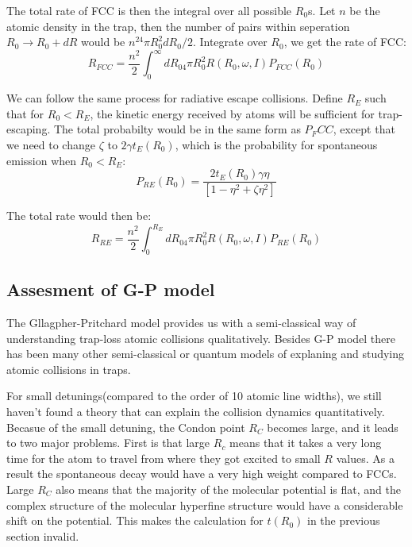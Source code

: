 \documentclass{article}
\begin{document}
The total rate of FCC is then the integral over all possible $R_0$s. Let $n$ be the atomic density in the trap, then the number of pairs within seperation $R_0\rightarrow R_0+dR$ would be $n^24\pi R_0^2dR_0/2$. Integrate over $R_0$, we get the rate of FCC:
$$R_{FCC}=\frac{n^2}{2}\int_0^\infty dR_04\pi R_0^2R(R_0,\omega,I)P_{FCC}(R_0)$$
 
We can follow the same process for radiative escape collisions. Define $R_E$ such that for $R_0<R_E$, the kinetic energy received by atoms will be sufficient for trap-escaping. The total probabilty would be in the same form as $P_FCC$, except that we need to change $\zeta$ to $2\gamma t_E(R_0)$, which is the probability for spontaneous emission when $R_0<R_E$:
$$P_{RE}(R_0)=\frac{2t_E(R_0)\gamma\eta}{[1-\eta^2+\zeta\eta^2]}$$

The total rate would then be:
$$R_{RE}=\frac{n^2}{2}\int_0^{R_E} dR_04\pi R_0^2R(R_0,\omega,I)P_{RE}(R_0)$$

\subsection{Assesment of G-P model}
The Gllagpher-Pritchard model provides us with a semi-classical way of understanding trap-loss atomic collisions qualitatively. Besides G-P model there has been many other semi-classical or quantum models of explaning and studying atomic collisions in traps.

For small detunings(compared to the order of 10 atomic line widths), we still haven't found a theory that can explain the collision dynamics quantitatively.  Becasue of the small detuning, the Condon point $R_C$ becomes large, and it leads to two major problems. First is that large $R_c$ means that it takes a very long time for the atom to travel from where they got excited to small $R$ values. As a result the spontaneous decay would have a very high weight compared to FCCs. Large $R_C$ also means that the majority of the molecular potential is flat, and the complex structure of the molecular hyperfine structure would have a considerable shift on the potential. This makes the calculation for $t(R_0)$ in the previous section invalid. 
\end{document}
